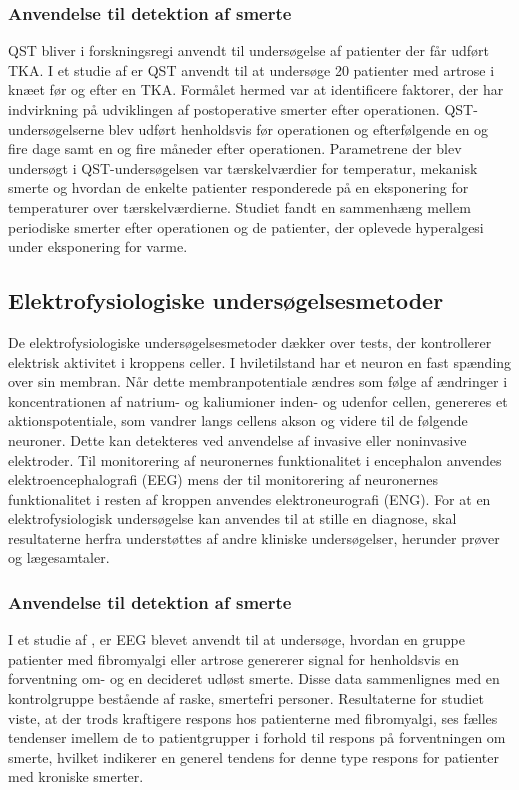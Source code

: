 \subsubsection{Anvendelse til detektion af smerte}
QST bliver i forskningsregi anvendt til undersøgelse af patienter der får udført TKA. I et studie af \citep{Martinez2007} er QST anvendt til at undersøge 20 patienter med artrose i knæet før og efter en TKA. Formålet hermed var at identificere faktorer, der har indvirkning på udviklingen af postoperative smerter efter operationen. QST-undersøgelserne blev udført henholdsvis før operationen og efterfølgende en og fire dage samt en og fire måneder efter operationen. Parametrene der blev undersøgt i QST-undersøgelsen var tærskelværdier for temperatur, mekanisk smerte og hvordan de enkelte patienter responderede på en eksponering for temperaturer over tærskelværdierne. Studiet fandt en sammenhæng mellem periodiske smerter efter operationen og de patienter, der oplevede hyperalgesi under eksponering for varme. \citep{Martinez2007} 

\subsection{Elektrofysiologiske undersøgelsesmetoder}
De elektrofysiologiske undersøgelsesmetoder dækker over tests, der kontrollerer elektrisk aktivitet i kroppens celler. I hviletilstand har et neuron en fast spænding over sin membran. Når dette membranpotentiale ændres som følge af ændringer i koncentrationen af natrium- og kaliumioner inden- og udenfor cellen, genereres et aktionspotentiale, som vandrer langs cellens akson og videre til de følgende neuroner. Dette kan detekteres ved anvendelse af invasive eller noninvasive elektroder. Til monitorering af neuronernes funktionalitet i encephalon anvendes elektroencephalografi (EEG) mens der til monitorering af neuronernes funktionalitet i resten af kroppen anvendes elektroneurografi (ENG). For at en elektrofysiologisk undersøgelse kan anvendes til at stille en diagnose, skal resultaterne herfra understøttes af andre kliniske undersøgelser, herunder prøver og lægesamtaler. \citep{Robinson2008}

\subsubsection{Anvendelse til detektion af smerte}
I et studie af \citep{Brown2013}, er EEG blevet anvendt til at undersøge, hvordan en gruppe patienter med fibromyalgi eller artrose genererer signal for henholdsvis en forventning om- og en decideret udløst smerte. Disse data sammenlignes med en kontrolgruppe bestående af raske, smertefri personer. Resultaterne for studiet viste, at der trods kraftigere respons hos patienterne med fibromyalgi, ses fælles tendenser imellem de to patientgrupper i forhold til respons på forventningen om smerte, hvilket indikerer en generel tendens for denne type respons for patienter med kroniske smerter. \citep{Brown2013}
   
